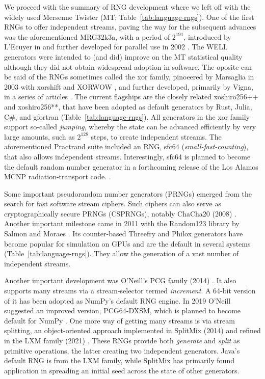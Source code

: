 \documentclass[manuscript,screen,review]{acmart}
\begin{document}
We proceed with the summary of RNG development where we left off with
the widely used Mersenne Twister (MT; Table~\ref{tab:language-rngs}).
One of the first RNGs to offer independent streams, paving the way for
the subsequent advances was the aforementioned MRG32k3a, with a period
of $2^{191}$, introduced by L'Ecuyer in \cite{lecuyer1999good} and
further developed for parallel use in 2002 \cite{lecuyer2002streams}.
The WELL generators \cite{panneton2006well} were intended to (and did)
improve on the MT statistical quality although they did not obtain
widespread adoption in software. The oposite can be said of the RNGs
sometimes called the xor family, pinoeered by Marsaglia in 2003 with
xorshift and XORWOW \cite{marsaglia2003xorshift}, and further
developed, primarily by Vigna, in a series of articles
\citep{panneton2005xorshift,vigna2016experimental,vigna2017further,
  blackman2021scrambled}. The current flagships are the closely
related xoshiro256++ and xoshiro256**, that have been adopted as
default generators by Rust, Julia, C\#, and gfortran
(Table~\ref{tab:language-rngs}). All generators in the xor family
support so-called \emph{jumping}, whereby the state can be advanced
efficiently by very large amounts, such as $2^{128}$ steps, to create
independent streams. The aforementioned Practrand suite included an
RNG, sfc64 (\emph{small-fast-counting}), that also allows independent
streams. Interestingly, sfc64 is planned to become the default random
number generator in a forthcoming release of the Los Alamos MCNP
radiation-transport code.
\cite{josey2023reassessing,gibson2025mcnpnewsletterq1}.

Some important pseudorandom number generators (PRNGs) emerged from the
search for fast software stream ciphers. Such ciphers can also serve
as cryptographically secure PRNGs (CSPRNGs), notably ChaCha20 (2008)
\cite{bernstein2008chacha}. Another important milestone came in 2011
with the Random123 library by Salmon and Moraes
\cite{salmon2011parallel}. Its counter-based Threefry and Philox
generators have become popular for simulation on GPUs and are the
default in several systems (Table~\ref{tab:language-rngs}). They allow
the generation of a vast number of independent streams.

Another important development was O'Neill's PCG family (2014)
\cite{oneill2014pcg}. It also supports many streams via a
stream-selector termed \emph{increment}. A 64-bit version of it has
been adopted as NumPy's default RNG engine. In 2019 O'Neill suggested
an improved version, PCG64-DXSM, which is planned to become default
for NumPy \cite{oneill2019pcg64dxsm-post,numpy_pcg64dxsm_upgrade}. One
more way of getting many streams is via stream splitting, an
object-oriented approach implemented in SplitMix (2014)
\cite{steele2014splitmix} and refined in the LXM family (2021)
\cite{steele2021lxm}. These RNGs provide both \emph{generate} and
\emph{split} as primitive operations, the latter creating two
independent generators. Java's default RNG is from the LXM family,
while SplitMix has primarily found application in spreading an initial
seed across the state of other generators.
\end{document}
